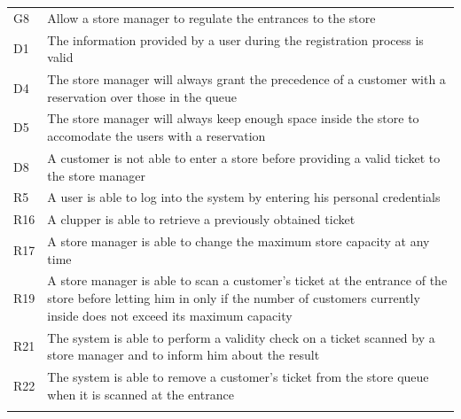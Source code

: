 \begin{longtable}[]{@{}
  >{\raggedright\arraybackslash}p{}
  >{\raggedright\arraybackslash}p{}@{}}
\toprule
G8 & Allow a store manager to regulate the entrances to the
store \\ \addlinespace
\midrule
\endhead
D1 & The information provided by a user during the registration process
is valid \\ \addlinespace
D4 & The store manager will always grant the precedence of a customer
with a reservation over those in the queue \\ \addlinespace
D5 & The store manager will always keep enough space inside the store to
accomodate the users with a reservation \\ \addlinespace
D8 & A customer is not able to enter a store before providing a valid
ticket to the store manager \\ \addlinespace
R5 & A user is able to log into the system by entering his personal
credentials \\ \addlinespace
R16 & A clupper is able to retrieve a previously obtained
ticket \\ \addlinespace
R17 & A store manager is able to change the maximum store capacity at
any time \\ \addlinespace
R19 & A store manager is able to scan a customer's ticket at the
entrance of the store before letting him in only if the number of
customers currently inside does not exceed its maximum
capacity \\ \addlinespace
R21 & The system is able to perform a validity check on a ticket scanned
by a store manager and to inform him about the result \\ \addlinespace
R22 & The system is able to remove a customer's ticket from the store
queue when it is scanned at the entrance \\ \addlinespace
\bottomrule
\end{longtable}

